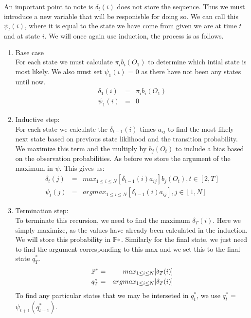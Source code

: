 An important point to note is $\delta_t(i)$ does not store the sequence. Thus we must introduce a new variable that will be responisble for doing so. We can call this $\psi_t(i)$, where it is equal to the state we have come from given we are at time $t$ and at state $i$. We will once again use induction, the process is as follows.

\begin{enumerate}
    \item Base case \\
    For each state we must calculate $\pi_i b_i(O_1)$ to determine which intial state is most likely. We also must set $\psi_1(i)$ = 0 as there have not been any states until now. 
    \begin{eqnarray}
        \delta_1(i) & = & \pi_i b_i(O_1) \\
        \psi_1(i)   & = & 0
    \end{eqnarray}

    \item Inductive step: \\
    For each state we calculate the $\delta_{t-1}(i)$ times $a_{ij}$ to find the most likely next state based on previous state liklihood and the transition probability. We maximize this term  and the multiply by  $b_j(O_t)$ to include a bias based on the observation probabilities. As before we store the argument of the maximum in $\psi$. This gives us:
    \begin{eqnarray}
        \delta_t(j) & = & max_{1 \leq i \leq N}[\delta_{t-1}(i) a_{ij}] b_j(O_t),  t \in [2,T] \\
        \psi_t(j)   & = & argmax_{1 \leq i \leq N}[\delta_{t-1}(i) a_{ij}], j \in [1,N]
    \end{eqnarray}

    \item Termination step: \\
    To terminate this recursion, we  need to find the maximum $\delta_{T}(i)$. Here we simply maximize, as the values have already been calculated in the induction. We will store this probability in $\mathbb{P}*$. Similarly for the final state, we just need to find the argument corresponding to this max and we set this to the final state $q_T^*$.
    \begin{eqnarray}
        \mathbb{P}^* & = & max_{1 \leq i \leq N}[\delta_{T}(i)] \\
        q_T^*   & = & argmax_{1 \leq i \leq N}[\delta_{T}(i)]
    \end{eqnarray}
    To find any particular states that we may be interseted in $q_t^*$, we use $q_t^*$ = $\psi_{t+1}(q_{t+1}^*)$. 
\end{enumerate}



